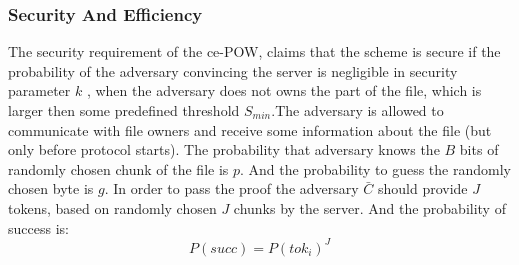 \documentclass[12pt]{article}
\begin{document}
\subsubsection{Security And Efficiency}
\label{subsub:secAndeff7}
The security requirement of the ce-POW, claims that the scheme is secure if the probability of the adversary convincing the server is negligible in security parameter $k$ , when the adversary does not owns the part of the file, which is larger then some predefined threshold $S_{min}$.The adversary is allowed to communicate with file owners and receive some information about the file (but only before protocol starts). The probability that adversary knows the $B$ bits of randomly chosen chunk of the file is $p$. And the probability to guess the randomly chosen byte is $g$. In order to pass the proof the adversary $\bar{C}$ should provide $J$ tokens, based on randomly chosen $J$ chunks by the server. And the probability of success is:
\begin{equation}\label{1}
 P(succ) = P(tok_i)^J
\end{equation}
\end{document}

